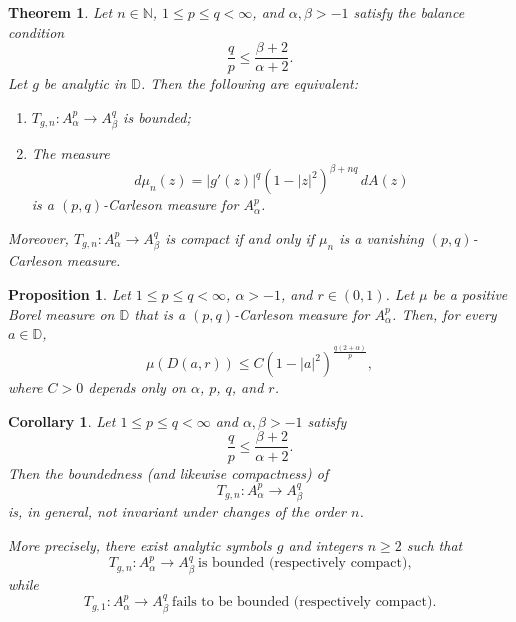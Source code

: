 \documentclass[10pt,a4paper]{amsart}
\newtheorem{theorem}{Theorem}
\newtheorem{proposition}{Proposition}
\newtheorem{corollary}{Corollary}
\begin{document}
\begin{theorem}
\label{thm:bergman-boundedness}
Let $n \in \mathbb{N}$, $1 \le p \le q < \infty$, and $ \alpha, \beta > -1 $ satisfy the balance condition
\begin{equation}\label{eq:balance}
\frac{q}{p} \le \frac{\beta + 2}{\alpha + 2}.
\end{equation}
Let $ g $ be analytic in $ \mathbb{D} $.
Then the following are equivalent:
\begin{enumerate}
\item[(i)] $ T_{g,n}: A_\alpha^p \to A_\beta^q $ is bounded;
\item[(ii)] The measure
\begin{equation*}
d\mu_n(z) = |g'(z)|^q (1 - |z|^2)^{\beta + nq} \, dA(z)
\end{equation*}
is a $(p,q)$-Carleson measure for $ A_\alpha^p $.
\end{enumerate}
Moreover, $ T_{g,n}: A_\alpha^p \to A_\beta^q $ is compact if and only if $ \mu_n $ is a vanishing $(p,q)$-Carleson measure.
\end{theorem}

\begin{proposition}\label{prop:carleson-condition}
Let $1 \leq p \leq q < \infty$, $\alpha > -1$, and $r \in (0,1)$.
Let $\mu$ be a positive Borel measure on $\mathbb{D}$ that is a $(p,q)$-Carleson measure for $A_\alpha^p$.
Then, for every $a \in \mathbb{D}$,
\begin{equation*}
\mu(D(a,r)) \leq C (1 - |a|^2)^{\frac{q(2+\alpha)}{p}},
\end{equation*}
where $C>0$ depends only on $\alpha$, $p$, $q$, and $r$.
\end{proposition}

\begin{corollary}\label{cor:not_invariant_n}
Let $1\le p\le q<\infty$ and $\alpha,\beta>-1$ satisfy
\begin{equation*}
\frac{q}{p}\le \frac{\beta+2}{\alpha+2}.
\end{equation*}
Then the boundedness (and likewise compactness) of
\begin{equation*}
T_{g,n}:A_\alpha^p\to A_\beta^q
\end{equation*}
is, in general, not invariant under changes of the order $n$.

More precisely, there exist analytic symbols $g$ and integers $n\ge2$ such that
\begin{equation*}
T_{g,n}:A_\alpha^p\to A_\beta^q \ \text{is bounded (respectively compact),}
\end{equation*}
while
\begin{equation*}
T_{g,1}:A_\alpha^p\to A_\beta^q \ \text{fails to be bounded (respectively compact).}
\end{equation*}
\end{corollary}
\end{document}
